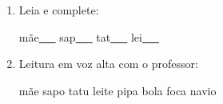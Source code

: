 \begin{exercicio}
\begin{enumerate}[resume]
\begin{enumerate}[label=(\alph*)]
    \item O som da unidade é: ( ) oral ( ) nasal 

    \item A primeira sílaba de MÃE é: ( ) MÃ ( ) MA

    \item As palavras da unidade aparecem: ( ) no início ( ) no meio ( ) no fim das palavras

  \end{enumerate}

  \item Leia e complete:
  \begin{center}
  mãe\underline{~~~} \quad sap\underline{~~~} \quad tat\underline{~~~} \quad lei\underline{~~~}
  \end{center}

  \item Leitura em voz alta com o professor:
  \begin{center}
  mãe \quad sapo \quad tatu \quad leite \quad pipa \quad bola \quad foca \quad navio
  \end{center}

\end{enumerate}

\end{exercicio}



